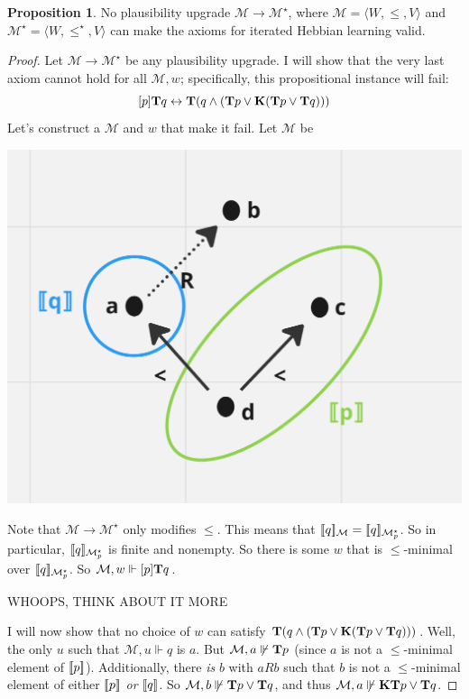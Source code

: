 \documentclass[letterpaper]{article}
\theoremstyle{definition}
\newtheorem{proposition}{Proposition}
\newcommand{\semantics}[1]{[\![\mbox{\em $ #1 $\/}]\!]}
\newcommand{\Model}{\mathcal{M}}
\newcommand{\Typ}[1]{\textrm{\textup{\textbf{T}}} #1}
\newcommand{\Know}[1]{\textrm{\textup{\textbf{K}}} #1}
\newcommand{\Update}[1]{[#1]}
\begin{document}
\begin{proposition}
    No plausibility upgrade $\Model \to \Model^\star$,  where $\Model = \langle W, \leq, V \rangle$ and $\Model^\star = \langle W, \leq^\star, V \rangle$ can make the axioms for iterated Hebbian learning valid.
\end{proposition}
\begin{proof}
    Let $\Model \to \Model^\star$ be any plausibility upgrade.  I will show that the very last axiom cannot hold for all $\Model, w$; specifically, this propositional instance will fail:
    \[
        \Update{p} \Typ{q} \leftrightarrow 
        \Typ{(q \land (\Typ{p} \lor \Know{(\Typ{p} \lor \Typ{q})}))}
    \]
    Let's construct a $\Model$ and $w$ that make it fail.  Let $\Model$ be

    \begin{center}
    \includegraphics[scale=0.18]{4-22-24-mockup.png}
    \end{center}

    Note that $\Model \to \Model^\star$ only modifies $\leq$.  This means that $\semantics{q}_\Model = \semantics{q}_{\Model^\star_p}$.  So in particular, $\semantics{q}_{\Model^\star_p}$ is finite and nonempty.  So there is some $w$ that is ${\leq}$-minimal over $\semantics{q}_{\Model^\star_p}$.  So $\Model, w \Vdash \Update{p} \Typ{q}$.

    WHOOPS, THINK ABOUT IT MORE 
    
    I will now show that no choice of $w$ can satisfy $\Typ{(q \land (\Typ{p} \lor \Know{(\Typ{p} \lor \Typ{q})}))}$.  Well, the only $u$ such that $\Model, u \Vdash q$ is $a$.  But $\Model, a \not \Vdash \Typ{p}$ (since $a$ is not a $\leq$-minimal element of $\semantics{p}$).  Additionally, there \emph{is} $b$ with $a{R}b$ such that $b$ is not a $\leq$-minimal element of either $\semantics{p}$ \emph{or} $\semantics{q}$.  So $\Model, b \not \Vdash \Typ{p} \lor \Typ{q}$, and thus $\Model, a \not \Vdash \Know{\Typ{p} \lor \Typ{q}}$.
    

\end{proof}
\end{document}
